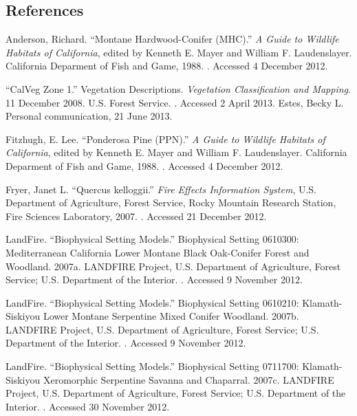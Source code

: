 \subsection*{References}
\begin{hangparas}{.25in}{1} 
Anderson, Richard. ``Montane Hardwood-Conifer (MHC).'' \emph{A Guide to Wildlife Habitats of California}, edited by Kenneth E. Mayer and William F. Laudenslayer. California Deparment of Fish and Game, 1988. . Accessed 4 December 2012.

``CalVeg Zone 1.'' Vegetation Descriptions. \emph{Vegetation Classification and Mapping}.  11 December 2008. U.S. Forest Service. . Accessed 2 April 2013.
Estes, Becky L. Personal communication, 21 June 2013.

Fitzhugh, E. Lee. ``Ponderosa Pine (PPN).'' \emph{A Guide to Wildlife Habitats of California}, edited by Kenneth E. Mayer and William F. Laudenslayer. California Deparment of Fish and Game, 1988. . Accessed 4 December 2012.

Fryer, Janet L. ``Quercus kelloggii.'' \emph{Fire Effects Information System}, U.S. Department of Agriculture, Forest Service,  Rocky Mountain Research Station, Fire Sciences Laboratory, 2007. . Accessed 21 December 2012.

LandFire. ``Biophysical Setting Models.'' Biophysical Setting 0610300: Mediterranean California Lower Montane Black Oak-Conifer Forest and Woodland. 2007a. LANDFIRE Project, U.S. Department of Agriculture, Forest Service; U.S. Department of the Interior. . Accessed 9 November 2012.

LandFire. ``Biophysical Setting Models.'' Biophysical Setting 0610210: Klamath-Siskiyou Lower Montane Serpentine Mixed Conifer Woodland. 2007b. LANDFIRE Project, U.S. Department of Agriculture, Forest Service; U.S. Department of the Interior. . Accessed 9 November 2012.

LandFire. ``Biophysical Setting Models.'' Biophysical Setting 0711700: Klamath-Siskiyou Xeromorphic Serpentine Savanna and Chaparral. 2007c. LANDFIRE Project, U.S. Department of Agriculture, Forest Service; U.S. Department of the Interior. . Accessed 30 November 2012.


\end{hangparas}
